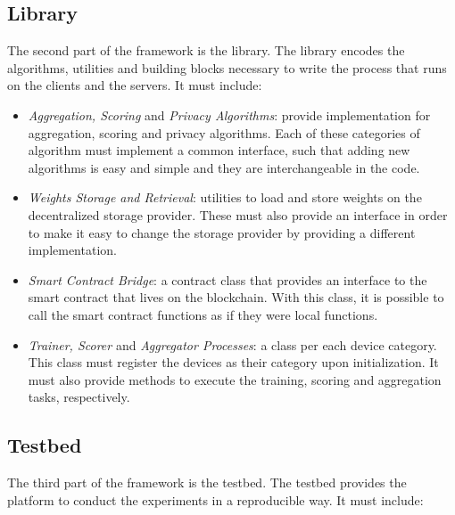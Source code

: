 \subsection{Library}\label{meth:library}

The second part of the framework is the library. The library encodes the algorithms, utilities and building blocks necessary to write the process that runs on the clients and the servers. It must include:

\begin{itemize}
    \item \textit{Aggregation, Scoring} and \textit{Privacy Algorithms}: provide implementation for aggregation, scoring and privacy algorithms. Each of these categories of algorithm must implement a common interface, such that adding new algorithms is easy and simple and they are interchangeable in the code.
    
    \item \textit{Weights Storage and Retrieval}: utilities to load and store weights on the decentralized storage provider. These must also provide an interface in order to make it easy to change the storage provider by providing a different implementation.
    
    \item \textit{Smart Contract Bridge}: a contract class that provides an interface to the smart contract that lives on the blockchain. With this class, it is possible to call the smart contract functions as if they were local functions.
    
    \item \textit{Trainer, Scorer} and \textit{Aggregator Processes}: a class per each device category. This class must register the devices as their category upon initialization. It must also provide methods to execute the training, scoring and aggregation tasks, respectively.
\end{itemize}

\subsection{Testbed}\label{meth:testbed}

The third part of the framework is the testbed. The testbed provides the platform to conduct the experiments in a reproducible way. It must include:


